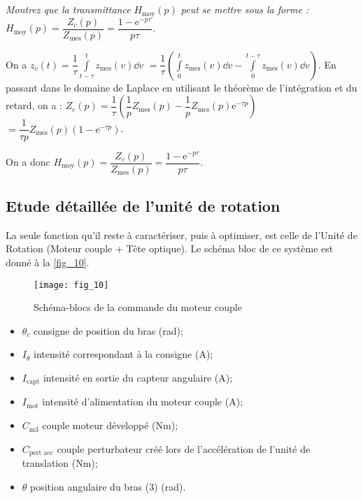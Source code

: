 \subparagraph{\label{q_}}\textit{Montrez que la transmittance $H_{\text{moy}}(p)$ peut se mettre sous la forme :
$H_{\text{moy}}(p) = \dfrac{Z_c(p)}{Z_{\text{mes}}(p)}=\dfrac{1-\text{e}^{-p\tau}}{p \tau}$.}
\ifprof
\begin{corrige}
On a $z_c(t)=\dfrac{1}{\tau} \int\limits_{t-\tau}^{t}z_{\text{mes}}(v)\dd v$ 
$=\dfrac{1}{\tau} \left( \int\limits_{0}^{t}z_{\text{mes}}(v)\dd v - \int\limits_{0}^{t-\tau}z_{\text{mes}}(v)\dd v \right)$. En passant dans le domaine de Laplace en utilisant le théorème de l'intégration et du retard, on a : 
$Z_c(p)=\dfrac{1}{\tau} \left( \dfrac{1}{p}Z_{\text{mes}}(p)- \dfrac{1}{p}Z_{\text{mes}}(p)\text{e}^{-\tau p}  \right)$$=\dfrac{1}{\tau p} Z_{\text{mes}}(p)\left( 1- \text{e}^{-\tau p}  \right)$.

On a donc $H_{\text{moy}}(p) = \dfrac{Z_c(p)}{Z_{\text{mes}}(p)}=\dfrac{1-\text{e}^{-p\tau}}{p \tau}$.

\end{corrige}
\else
\fi

\subsection{Etude détaillée de l'unité de rotation}


La seule fonction qu’il reste à caractériser, puis à optimiser, est celle de l’Unité de Rotation (Moteur
couple + Tête optique). Le schéma bloc de ce système est donné à la \autoref{fig_10}.


\begin{figure}[H]
\centering
\texttt{[image: fig\_10]}
\caption{\label{fig_10} Schéma-blocs de la commande du moteur couple}
\end{figure}


\begin{multicols}{2}
\begin{itemize}
\item $\theta_c$ consigne de position du bras (rad);
\item $I_{\theta}$ intensité correspondant à la consigne (A);
\item $I_{\text{capt}}$ intensité en sortie du capteur angulaire (A);
\item $I_{\text{mot}}$ intensité d’alimentation du moteur couple (A);
\item $C_{\text{m3}}$ couple moteur développé (Nm);
\item $C_{\text{pert acc}}$ couple perturbateur créé lors de l’accélération de
l’unité de translation (Nm);
\item $\theta$ position angulaire du bras (3) (rad).
\end{itemize}
\end{multicols}

